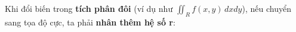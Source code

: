 \documentclass[preview]{standalone}
\begin{document}
\begin{center}
Khi đổi biến trong \textbf{tích phân đôi} (ví dụ như $\iint_R f(x, y) \, dxdy$), nếu chuyển sang tọa độ cực, ta phải \textbf{nhân thêm hệ số r}:
\end{center}
\end{document}
